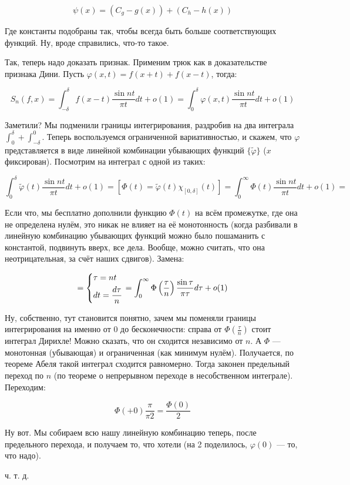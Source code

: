 \documentclass{article}
\begin{document}
\[\psi(x) = (C_g - g(x)) + (C_h - h(x))\]

Где константы подобраны так, чтобы всегда быть больше соответствующих функций. Ну, вроде справились, что-то такое.

Так, теперь надо доказать признак. Применим трюк как в доказательстве признака Дини. Пусть $\varphi(x, t) = f(x + t) + f(x - t)$, тогда:

\[S_n(f, x) = \int_{-\delta}^{\delta} f(x - t) \frac{\sin nt}{\pi t} dt + o(1) = \int_{0}^{\delta} \varphi(x, t) \frac{\sin nt}{\pi t} dt + o(1)\]

Заметили? Мы подменили границы интегрирования, раздробив на два интеграла $\int_{0}^{\delta} + \int_{-\delta}^{0}$. Теперь воспользуемся ограниченной вариативностью, и скажем, что $\varphi$ представляется в виде линейной комбинации убывающих функций $\{\tilde{\varphi}\}$ ($x$ фиксирован). Посмотрим на интеграл с одной из таких:

\[\int_{0}^{\delta} \tilde{\varphi}(t)\frac{\sin nt}{\pi t}dt + o(1) = [\Phi(t) = \tilde{\varphi}(t)\chi_{[0, \delta]}(t)] = \int_{0}^{\infty} \Phi(t) \frac{\sin nt}{\pi t} dt + o(1) = \]

Если что, мы бесплатно дополнили функцию $\Phi(t)$ на всём промежутке, где она не определена нулём, это никак не влияет на её монотонность (когда разбивали в линейную комбинацию убывающих функций можно было пошаманить с константой, подвинуть вверх, все дела. Вообще, можно считать, что она неотрицательная, за счёт наших сдвигов). Замена:

\[= \begin{dcases}
    \tau = nt \\
    dt = \frac{d\tau}{n}
\end{dcases} = \int_{0}^{\infty} \Phi\left(\frac{\tau}{n}\right) \frac{\sin \tau}{\pi \tau} d\tau + o(1)\]

Ну, собственно, тут становится понятно, зачем мы поменяли границы интегрирования на именно от 0 до бесконечности: справа от $\Phi\left(\frac{\tau}{n}\right)$ стоит интеграл Дирихле! Можно сказать, что он сходится независимо от $n$. А $\Phi$ --- монотонная (убывающая) и ограниченная (как минимум нулём). Получается, по теореме Абеля такой интеграл сходится равномерно. Тогда законен предельный переход по $n$ (по теореме о непрерывном переходе в несобственном интеграле). Переходим:

\[\Phi(+ 0) \frac{\pi}{\pi2} = \frac{\Phi(0)}{2}\]

Ну вот. Мы собираем всю нашу линейную комбинацию теперь, после предельного перехода, и получаем то, что хотели (на 2 поделилось, $\varphi(0)$ --- то, что надо).

ч. т. д. 
\end{document}
